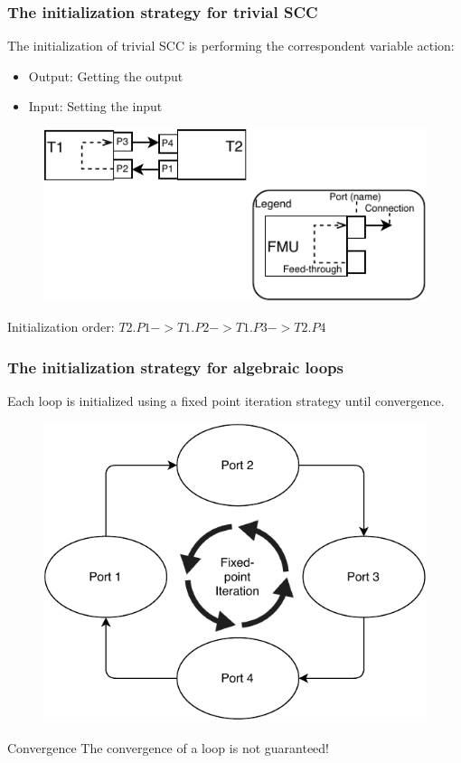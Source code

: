 \documentclass{beamer}
\begin{document}
\begin{frame}
\frametitle{The initialization strategy for trivial SCC}
The initialization of trivial SCC is performing the correspondent variable action:
\begin{itemize}
    \item Output: Getting the output
    \item Input: Setting the input
\end{itemize}
\begin{figure}
    \centering
    \includegraphics[scale=1.0]{images/SimpleFMUS.pdf}
\end{figure}
Initialization order: $T2.P1 -> T1.P2 -> T1.P3 -> T2.P4$

\end{frame}
        
\begin{frame}
\frametitle{The initialization strategy for algebraic loops}
Each loop is initialized using a fixed point iteration strategy until convergence.
    
\begin{figure}
    \centering
    \includegraphics[scale=0.6]{images/ExpansionPlugin-Page-4.pdf}
\end{figure}
    
\begin{alertblock}{Convergence}
    The convergence of a loop is not guaranteed!
\end{alertblock}
    
\end{frame}
\end{document}
